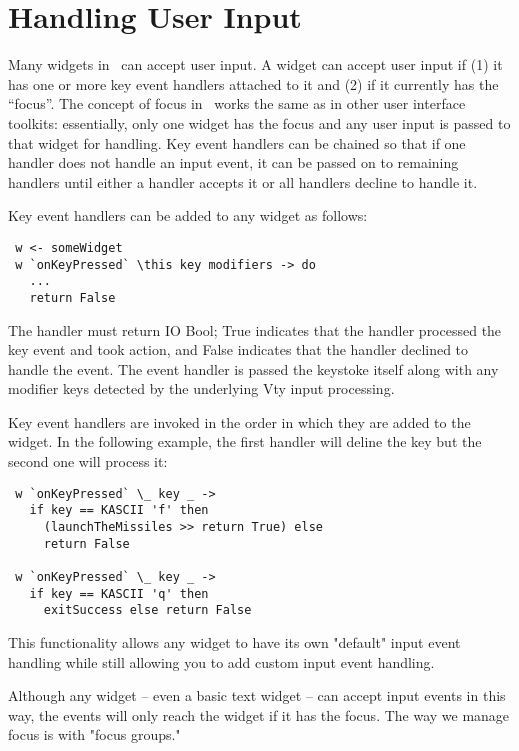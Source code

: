 \section{Handling User Input}

Many widgets in \vtyui\ can accept user input.  A widget can accept
user input if (1) it has one or more key event handlers attached to it
and (2) if it currently has the ``focus''.  The concept of focus in
\vtyui\ works the same as in other user interface toolkits:
essentially, only one widget has the focus and any user input is
passed to that widget for handling.  Key event handlers can be chained
so that if one handler does not handle an input event, it can be
passed on to remaining handlers until either a handler accepts it or
all handlers decline to handle it.

Key event handlers can be added to any widget as follows:

\begin{verbatim}
 w <- someWidget
 w `onKeyPressed` \this key modifiers -> do
   ...
   return False
\end{verbatim}

The handler must return IO Bool; True indicates that the handler
processed the key event and took action, and False indicates that the
handler declined to handle the event.  The event handler is passed the
keystoke itself along with any modifier keys detected by the underlying
Vty input processing.

Key event handlers are invoked in the order in which they are added to
the widget.  In the following example, the first handler will deline the
 key but the second one will process it:

\begin{verbatim}
 w `onKeyPressed` \_ key _ ->
   if key == KASCII 'f' then
     (launchTheMissiles >> return True) else
     return False

 w `onKeyPressed` \_ key _ ->
   if key == KASCII 'q' then
     exitSuccess else return False
\end{verbatim}

This functionality allows any widget to have its own "default" input
event handling while still allowing you to add custom input event
handling.

Although any widget -- even a basic text widget -- can accept input
events in this way, the events will only reach the widget if it has the
focus.  The way we manage focus is with "focus groups."
